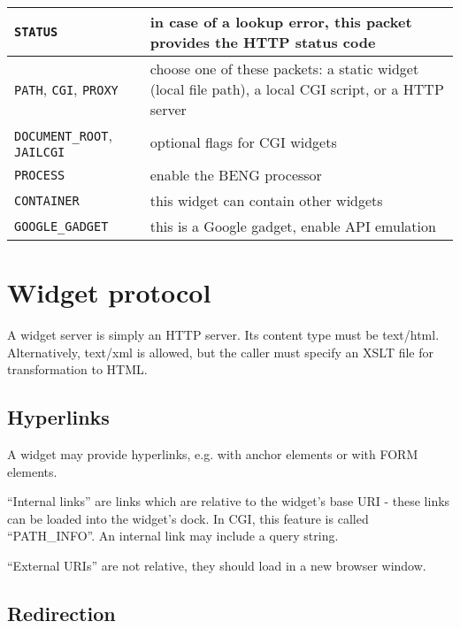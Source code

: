 \documentclass[a4paper,12pt]{article}
\begin{document}
\begin{tabular}{|l|p{10cm}|}
\hline
\texttt{STATUS} & in case of a lookup error, this packet provides the
HTTP status code \\
\hline

\texttt{PATH}, \texttt{CGI}, \texttt{PROXY} & choose one of these
packets: a static widget (local file path), a local CGI script, or a
HTTP server \\

\hline

\texttt{DOCUMENT\_ROOT}, \texttt{JAILCGI} & optional flags for CGI
widgets \\

\hline
\texttt{PROCESS} & enable the BENG processor \\
\hline
\texttt{CONTAINER} & this widget can contain other widgets \\
\hline

\texttt{GOOGLE\_GADGET} & this is a Google gadget, enable API
emulation \\

\hline
\end{tabular}


\section{Widget protocol}

A widget server is simply an HTTP server.  Its content type must be
text/html.  Alternatively, text/xml is allowed, but the caller must
specify an XSLT file for transformation to HTML.


\subsection{Hyperlinks}

A widget may provide hyperlinks, e.g. with anchor elements or with
FORM elements.

``Internal links'' are links which are relative to the widget's base
URI - these links can be loaded into the widget's dock.  In CGI, this
feature is called ``PATH\_INFO''.  An internal link may include a
query string.

``External URIs'' are not relative, they should
load in a new browser window.

\subsection{Redirection}
\end{document}
